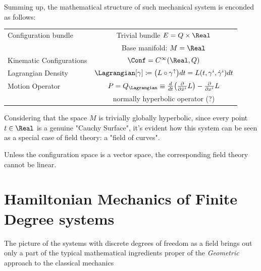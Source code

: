 \documentclass[Main]{subfiles}
\begin{document}
		Summing up, the mathematical structure of such mechanical system is enconded as follows:
			\begin{center}\begin{tabular}{|l|c|}
			\hline
			Configuration bundle & Trivial bundle  $E= Q \times \Real$\\
													& Base manifold: $M=\Real$\\
			\hline
			Kinematic Configurations &  $\Conf=C^\infty(\Real,Q)$\\
			\hline
			Lagrangian Density		&	$\Lagrangian  [\gamma] \coloneqq \big( L \circ	\gamma^\uparrow \big) dt  = L(t,\gamma^i,\dot{\gamma}^i) dt$\\
			\hline
			Motion Operator			&  $P=Q_\Lagrangian \equiv \frac{d}{dt}\big(\frac{\partial}{\partial \dot{x}^i}L\big)-\frac{\partial}{\partial x^i}L $\\
													& normally hyperbolic operator (\danger ?)\\
			\hline
			\end{tabular}\end{center}
			
			Considering that the space $M$ is trivially globally hyperbolic, since every point $t\in\Real$ is a genuine "Cauchy Surface", it's evident how this system can be seen as a special case of field theory: a "field of curves".
			\begin{observation}
				Unless the configuration space is a vector space, the corresponding field theory cannot be linear.
			\end{observation}		
		
	\section{Hamiltonian Mechanics of Finite Degree systems}
		The picture of the systems with discrete degrees of freedom as a field brings out only a part of the typical mathematical ingredients proper of the \emph{Geometric} approach to the classical mechanics
\end{document}
